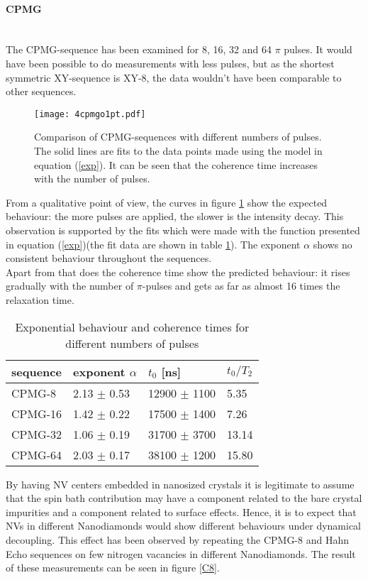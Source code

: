 \documentclass[12pt,a4paper]{article}
\begin{document}
\paragraph{CPMG}\mbox{}\\
The CPMG-sequence has been examined for 8, 16, 32 and 64 $\pi$ pulses. It would have been possible to do measurements with less pulses, but as the shortest symmetric XY-sequence is XY-8, the data wouldn't have been comparable to other sequences.\\
\begin{figure}[H]
\texttt{[image: 4cpmgo1pt.pdf]} 
\caption{Comparison of CPMG-sequences with different numbers of pulses. The solid lines are fits to the data points made using the model in equation (\ref{exp}). It can be seen that the coherence time increases with the number of pulses.}
\label{C4}
\end{figure}
From a qualitative point of view, the curves in figure \ref{C4} show the expected behaviour: the more pulses are applied, the slower is the intensity decay. This observation is supported by the fits which were made with the function presented in equation (\ref{exp})(the fit data are shown in table \ref{ct}). The exponent $\alpha$ shows no consistent behaviour throughout the sequences. \\
Apart from that does the coherence time show the predicted behaviour: it rises gradually with the number of $\pi$-pulses and gets as far as almost 16 times the relaxation time.\\
\begin{table}[H]
\centering
\caption{Exponential behaviour and coherence times for different numbers of pulses}
\label{ct}
\begin{tabular}{l|ll|l}
sequence & exponent $\alpha$             & $t_0$ {[}ns{]}  & $t_0/T_2$                     \\\hline
CPMG-8   & 2.13  $\pm$ 0.53 & 12900           $\pm$ 1100 & 5.35\\
CPMG-16  & 1.42  $\pm$ 0.22 & 17500            $\pm$ 1400 &7.26\\
CPMG-32  & 1.06  $\pm$ 0.19 & 31700         $\pm$ 3700 & 13.14\\
CPMG-64  & 2.03  $\pm$ 0.17  & 38100        $\pm$ 1200 & 15.80
\end{tabular}
\end{table}
By having NV centers embedded in nanosized crystals it is legitimate to assume that the spin bath contribution may have a component related to the bare crystal impurities and a component related to surface effects. Hence, it is to expect that NVs in different Nanodiamonds would show different behaviours under dynamical decoupling. This effect has  been observed by repeating the CPMG-8 and  Hahn Echo sequences on few nitrogen vacancies in different Nanodiamonds. The result of these measurements can be seen in figure \ref{C8}.
\end{document}
